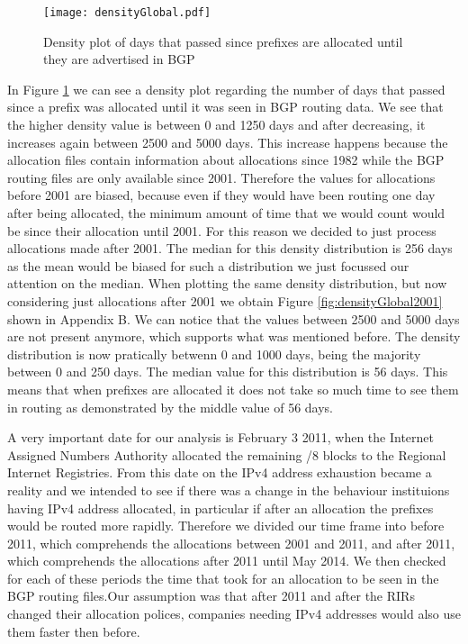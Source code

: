 \documentclass[11pt,a4paper]{scrreprt}
\begin{document}
\begin{figure}[!h]
\centering
\texttt{[image: densityGlobal.pdf]}
\caption{Density plot of days that passed since prefixes are allocated until they are advertised in BGP}
\label{fig:densityGlobal}
\end{figure}

In Figure \ref{fig:densityGlobal} we can see a density plot regarding the number of days that passed since a prefix was allocated until it was seen in BGP routing data. 
We see that the higher density value is between 0 and 1250 days and after decreasing, it increases again between 2500 and 5000 days. This increase happens because the allocation files contain information about allocations since 1982 while the BGP routing files are only available since 2001. Therefore the values for allocations before 2001 are biased, because even if they would have been routing one day after being allocated, the minimum amount of time that we would count would be since their allocation until 2001. For this reason we decided to just process allocations made after 2001. The median for this density distribution is 256 days as the mean would be biased for such a distribution we just focussed our attention on the median.
When plotting the same density distribution, but now considering just allocations after 2001 we obtain Figure \ref{fig:densityGlobal2001} shown in Appendix B. We can notice that the values between 2500 and 5000 days are not present anymore, which supports what was mentioned before. The density distribution is now pratically betwenn 0 and 1000 days, being the majority between 0 and 250 days. The median value for this distribution is 56 days. This means that when prefixes are allocated it does not take so much time to see them in routing as demonstrated by the middle value of 56 days. 

A very important date for our analysis is February 3 2011, when the Internet Assigned Numbers Authority allocated the remaining /8 blocks to the Regional Internet Registries. From this date on the IPv4 address exhaustion became a reality and we intended to see if there was a change in the behaviour instituions having IPv4 address allocated, in particular if after an allocation the prefixes would be routed more rapidly. Therefore we divided our time frame into before 2011, which comprehends the allocations between 2001 and 2011, and after 2011, which comprehends the allocations after 2011 until May 2014. We then checked for each of these periods the time that took for an allocation to be seen in the BGP routing files.Our assumption was that after 2011 and after the RIRs changed their allocation polices, companies needing IPv4 addresses would also use them faster then before. 
\end{document}
